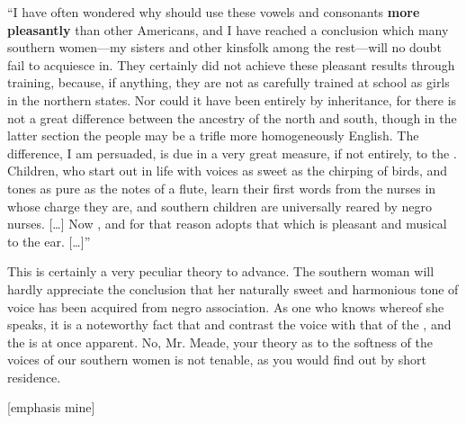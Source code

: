 \begin{ipquote}
“I have often wondered why  should use these vowels and consonants \textbf{more pleasantly} than other Americans, and I have reached a conclusion which many southern women—my sisters and other kinsfolk among the rest—will no doubt fail to acquiesce in. They certainly did not achieve these pleasant results through training, because, if anything, they are not as carefully trained at school as girls in the northern states. Nor could it have been entirely by inheritance, for there is not a great difference between the ancestry of the north and south, though in the latter section the people may be a trifle more homogeneously English. The difference, I am persuaded, is due in a very great measure, if not entirely, to the . Children, who start out in life with voices as sweet as the chirping of birds, and tones as pure as the notes of a flute, learn their first words from the nurses in whose charge they are, and southern children are universally reared by negro nurses. […] Now , and for that reason adopts that which is pleasant and musical to the ear. […]”

{This is certainly a very peculiar theory to advance. The southern woman will hardly appreciate the conclusion that her naturally sweet and harmonious tone of voice has been acquired from negro association. As one who knows whereof she speaks, it is a noteworthy fact that  and contrast the voice with that of the , and the  is at once apparent. No, Mr. Meade, your theory as to the softness of the voices of our southern women is not tenable, as you would find out by short residence.

\raggedleft
{[emphasis mine]}\\
}
\end{ipquote}

